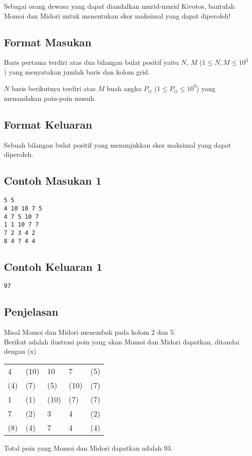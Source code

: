 \documentclass{article}
\begin{document}
Sebagai orang dewasa yang dapat diandalkan murid-murid Kivotos, bantulah Momoi dan Midori untuk menentukan skor maksimal yang dapat diperoleh!

\subsection*{Format Masukan}

Baris pertama terdiri atas dua bilangan bulat positif yaitu $N$, $M$ ($1 \leq N, M \leq 10^3$) yang menyatakan jumlah baris dan kolom grid.

$N$ baris berikutnya terdiri atas $M$ buah angka $P_{ij}$ ($1 \leq P_{ij} \leq 10^9$) yang menandakan poin-poin musuh.

\subsection*{Format Keluaran}

Sebuah bilangan bulat positif yang menunjukkan skor maksimal yang dapat diperoleh.

\begin{multicols}{2}
\subsection*{Contoh Masukan 1}
\begin{lstlisting}
5 5
4 10 10 7 5
4 7 5 10 7
1 1 10 7 7
7 2 3 4 2
8 4 7 4 4
\end{lstlisting}
\columnbreak
\subsection*{Contoh Keluaran 1}
\begin{lstlisting}
97
\end{lstlisting}
\vfill
\null
\end{multicols}


\subsection*{Penjelasan}

Misal Momoi dan Midori menembak pada kolom 2 dan 5.\\
Berikut adalah ilustrasi poin yang akan Momoi dan Midori dapatkan, ditandai dengan (x)

\begin{tabular}{lllll}
4   & (10) & 10   & 7    & (5) \\
(4) & (7)  & (5)  & (10) & (7) \\
1   & (1)  & (10) & (7)  & (7) \\
7   & (2)  & 3    & 4    & (2) \\
(8) & (4)  & 7    & 4    & (4)
\end{tabular}

Total poin yang Momoi dan Midori dapatkan adalah 93.
\end{document}
